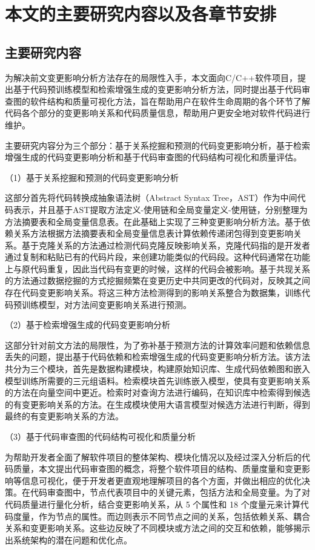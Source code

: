 \section{本文的主要研究内容以及各章节安排}
\subsection{主要研究内容}

为解决前文变更影响分析方法存在的局限性入手，本文面向C/C++软件项目，提出基于代码预训练模型和检索增强生成的变更影响分析方法，同时提出基于代码审查图的软件结构和质量可视化方法，旨在帮助用户在软件生命周期的各个环节了解代码各个部分的变更影响关系和代码质量信息，帮助用户更安全地对软件代码进行维护。

主要研究内容分为三个部分：基于关系挖掘和预测的代码变更影响分析，基于检索增强生成的代码变更影响分析和基于代码审查图的代码结构可视化和质量评估。

（1）基于关系挖掘和预测的代码变更影响分析

这部分首先将代码转换成抽象语法树（Abstract Syntax Tree，AST）作为中间代码表示，并且基于AST提取方法定义-使用链和全局变量定义-使用链，分别整理为方法摘要表和全局变量信息表。在此基础上实现了三种变更影响分析方法。基于依赖关系方法根据方法摘要表和全局变量信息表计算依赖传递闭包得到变更影响关系。基于克隆关系的方法通过检测代码克隆反映影响关系，克隆代码指的是开发者通过复制和粘贴已有的代码片段，来创建功能类似的代码段。这种代码通常在功能上与原代码重复，因此当代码有变更的时候，这样的代码会被影响。基于共现关系的方法通过数据挖掘的方式挖掘频繁在变更历史中共同更改的代码对，反映其之间存在代码变更影响关系。将这三种方法检测得到的影响关系整合为数据集，训练代码预训练模型，对方法间变更影响关系进行预测。


（2）基于检索增强生成的代码变更影响分析

这部分针对前文方法的局限性，为了弥补基于预测方法的计算效率问题和依赖信息丢失的问题，提出基于代码依赖和检索增强生成的代码变更影响分析方法。该方法共分为三个模块，首先是数据构建模块，构建原始知识库、生成代码依赖图和嵌入模型训练所需要的三元组语料。检索模块首先训练嵌入模型，使具有变更影响关系的方法在向量空间中更近。检索时对查询方法进行编码，在知识库中检索得到候选的有变更影响关系的方法。在生成模块使用大语言模型对候选方法进行判断，得到最终的有变更影响关系的方法。

（3）基于代码审查图的代码结构可视化和质量分析

为帮助开发者全面了解软件项目的整体架构、模块化情况以及经过深入分析后的代码质量，本文提出代码审查图的概念，将整个软件项目的结构、质量度量和变更影响等信息可视化，便于开发者更直观地理解项目的各个方面，并做出相应的优化决策。在代码审查图中，节点代表项目中的关键元素，包括方法和全局变量。为了对代码质量进行量化分析，结合变更影响关系，从 5 个属性和 18 个度量元来计算代码度量，作为节点的属性。而边则表示不同节点之间的关系，包括依赖关系、耦合关系和变更影响关系。这些边反映了不同模块或方法之间的交互和依赖，能够揭示出系统架构的潜在问题和优化点。


